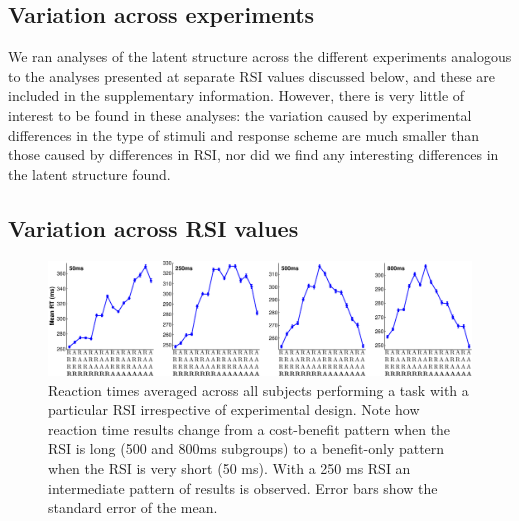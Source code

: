 \documentclass{apa}[12pt]
\begin{document}
\subsection{Variation across experiments}

We ran analyses of the latent structure across the different experiments analogous to the analyses presented at separate RSI values discussed below, and these are included in the supplementary information. However, there is very little of interest to be found in these analyses: the variation caused by experimental differences in the type of stimuli and response scheme are much smaller than those caused by differences in RSI, nor did we find any interesting differences in the latent structure found.

\subsection{Variation across RSI values}

\begin{figure}[t]
\centering
\includegraphics[width=1\textwidth]{rsi_scan.pdf}
\caption[Mean reaction time patterns as a function of RSI]{Reaction times averaged across all subjects performing a task with a particular RSI irrespective of experimental design. Note how reaction time results change from a cost-benefit pattern when the RSI is long (500 and 800ms subgroups) to a benefit-only pattern when the RSI is very short (50 ms). With a 250 ms RSI an intermediate pattern of results is observed. Error bars show the standard error of the mean.\label{rsi_scan}}
\end{figure}
\end{document}
